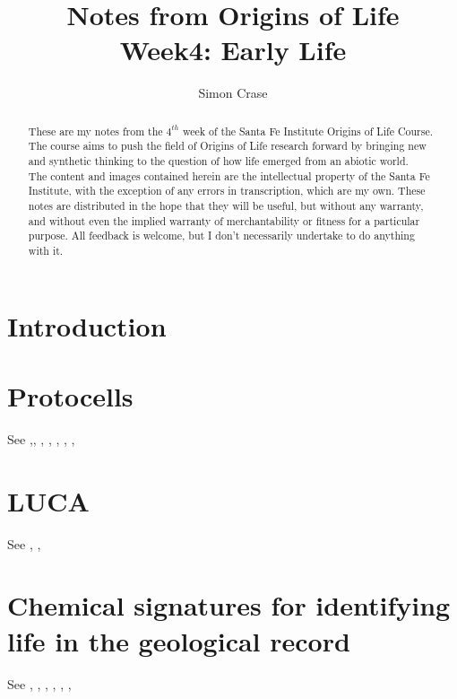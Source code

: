 \documentclass[]{article}
\title{Notes from Origins of Life\\Week4: Early Life}
\author{Simon Crase}
\begin{document}
\maketitle

\begin{abstract}
   These are my notes from the $4^{th}$ week of the Santa Fe Institute Origins of Life Course\cite{sfi2019}. The course aims to push the field of Origins of Life research forward by bringing new and synthetic thinking to the question of how life emerged from an abiotic world.\\
   The content and images contained herein are the intellectual property of the Santa Fe Institute, with the exception of any errors in transcription, which are my own.
   These notes are distributed in the hope that they will be useful,
   but without any warranty, and without even the implied warranty of
   merchantability or fitness for a particular purpose. All feedback is welcome,
   but I don't necessarily undertake to do anything with it.
\end{abstract}

\setcounter{tocdepth}{2}
\tableofcontents

\section{Introduction}

\section{Protocells}

See  \cite{deamer2017role},\cite{maurer2011primitive}, \cite{segre2001lipid}, \cite{sojo2016origin}, \cite{adamala2016programmable}, \cite{monnard2015current}, \cite{zhu2012photochemically},   \cite{chen2004emergence}

\section{LUCA}

See \cite{penny1999nature}, \cite{weiss2016physiology}, \cite{torino2013piecing}

\section{Chemical signatures for identifying life in the geological record }

See \cite{sharp2017principles}, \cite{bell2015potentially}, \cite{rosing199913c}, \cite{ueno2006evidence}, \cite{shen2001isotopic}, \cite{summons19992}, \cite{han1992megascopic}
\end{document}
